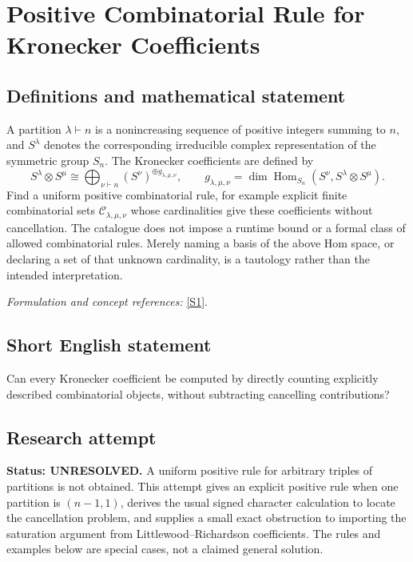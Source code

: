 \documentclass[11pt]{article}
\begin{document}
\section*{\texorpdfstring{Positive Combinatorial Rule for Kronecker Coefficients}{Positive Combinatorial Rule for Kronecker Coefficients}}\label{375}
\subsection{Definitions and mathematical statement}
A partition $\lambda\vdash n$ is a nonincreasing sequence of positive integers summing to $n$, and $S^\lambda$ denotes the corresponding irreducible complex representation of the symmetric group $S_n$. The Kronecker coefficients are defined by
\[
 S^\lambda\otimes S^\mu\cong
 \bigoplus_{\nu\vdash n}(S^\nu)^{\oplus g_{\lambda,\mu,\nu}},
 \qquad
 g_{\lambda,\mu,\nu}=\dim\operatorname{Hom}_{S_n}
 (S^\nu,S^\lambda\otimes S^\mu).
\]
Find a uniform positive combinatorial rule, for example explicit finite combinatorial sets $\mathcal C_{\lambda,\mu,\nu}$ whose cardinalities give these coefficients without cancellation. The catalogue does not impose a runtime bound or a formal class of allowed combinatorial rules. Merely naming a basis of the above Hom space, or declaring a set of that unknown cardinality, is a tautology rather than the intended interpretation.
\par\smallskip\textit{Formulation and concept references:} \href{https://arxiv.org/abs/2604.23286}{[S1]}.

\subsection{Short English statement}
Can every Kronecker coefficient be computed by directly counting explicitly described combinatorial objects, without subtracting cancelling contributions?
\subsection{Research attempt}
\textbf{Status: UNRESOLVED.} A uniform positive rule for arbitrary triples of partitions is not obtained. This attempt gives an explicit positive rule when one partition is $(n-1,1)$, derives the usual signed character calculation to locate the cancellation problem, and supplies a small exact obstruction to importing the saturation argument from Littlewood--Richardson coefficients. The rules and examples below are special cases, not a claimed general solution.
\end{document}

